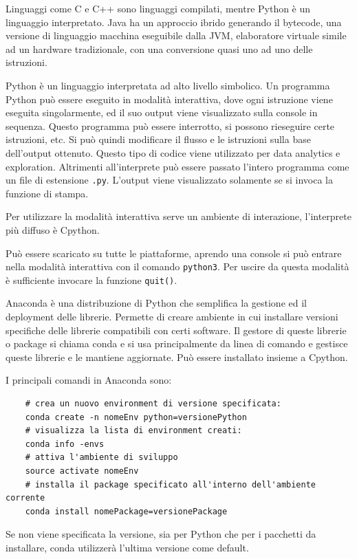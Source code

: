 \documentclass{article}
\numberwithin{equation}{subsection}
\begin{document}
Linguaggi come C e C++ sono linguaggi compilati, mentre Python è un linguaggio interpretato. 
Java ha un approccio ibrido generando il bytecode, una versione di linguaggio macchina eseguibile 
dalla JVM, elaboratore virtuale simile ad un hardware tradizionale, con una conversione 
quasi uno ad uno delle istruzioni. 

Python è un linguaggio interpretata ad alto livello simbolico. Un programma Python può 
essere eseguito in modalità interattiva, dove ogni istruzione viene eseguita singolarmente, 
ed il suo output viene visualizzato sulla console in sequenza. Questo programma può essere 
interrotto, si possono rieseguire certe istruzioni, etc. Si può quindi modificare il flusso 
e le istruzioni sulla base dell'output ottenuto. Questo tipo di codice viene utilizzato 
per data analytics e exploration. 
Altrimenti all'interprete può essere passato l'intero programma come un file di estensione \verb|.py|. 
L'output viene visualizzato solamente se si invoca la funzione di stampa. 

Per utilizzare la modalità interattiva serve un ambiente di interazione, l'interprete 
più diffuso è Cpython. 

Può essere scaricato su tutte le piattaforme, aprendo una console si può entrare nella modalità interattiva con il comando \verb|python3|. 
Per uscire da questa modalità è sufficiente invocare la funzione \verb|quit()|. 

Anaconda è una distribuzione di Python che semplifica la gestione ed il deployment delle librerie. Permette di creare ambiente 
in cui installare versioni specifiche delle librerie compatibili con certi software. Il gestore di queste librerie o package 
si chiama conda e si usa principalmente da linea di comando e gestisce queste librerie e le mantiene aggiornate. Può essere 
installato insieme a Cpython. 

I principali comandi in Anaconda sono:
\begin{verbatim}
    # crea un nuovo environment di versione specificata: 
    conda create -n nomeEnv python=versionePython 
    # visualizza la lista di environment creati:
    conda info -envs                 
    # attiva l'ambiente di sviluppo
    source activate nomeEnv            
    # installa il package specificato all'interno dell'ambiente corrente
    conda install nomePackage=versionePackage
\end{verbatim}
Se non viene specificata la versione, sia per Python che per i pacchetti da installare, 
conda utilizzerà l'ultima versione come default. 
\end{document}
